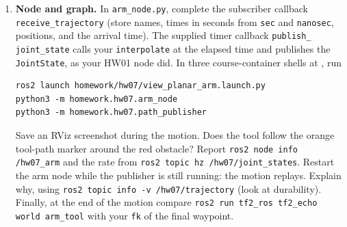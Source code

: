 \begin{enumerate}[start=3]
\begin{enumerate}
waypoints?
\item \textbf{Node and graph.} In \texttt{arm\_node.py}, complete the
subscriber callback \texttt{receive\_\allowbreak trajectory} (store names,
times in seconds from \texttt{sec} and \texttt{nanosec}, positions, and the
arrival time). The supplied timer callback \texttt{publish\_\allowbreak
joint\_state} calls your \texttt{interpolate} at the elapsed time and
publishes the \texttt{JointState}, as your HW01 node did. In three
course-container shells at , run
\begin{lstlisting}
ros2 launch homework/hw07/view_planar_arm.launch.py
python3 -m homework.hw07.arm_node
python3 -m homework.hw07.path_publisher
\end{lstlisting}
Save an RViz screenshot during the motion. Does the tool follow the orange
tool-path marker around the red obstacle? Report \texttt{ros2 node info
/hw07\_arm} and the rate from \texttt{ros2 topic hz /hw07/joint\_states}.
Restart the arm node while the publisher is still running: the motion
replays. Explain why, using \texttt{ros2 topic info -v /hw07/trajectory}
(look at durability). Finally, at the end of the motion compare
\texttt{ros2 run tf2\_ros tf2\_echo world arm\_tool} with your
\texttt{fk} of the final waypoint.
\end{enumerate}
\end{enumerate}

\submission

